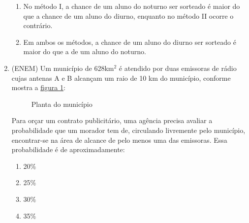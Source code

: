\begin{enumerate}
\begin{enumerate}
\item {} 
No método I, a chance de um aluno do noturno ser sorteado é maior do que a chance de um aluno do diurno, enquanto no método II ocorre o contrário.

\item {} 
Em ambos os métodos, a chance de um aluno do diurno ser sorteado é maior do que a de um aluno do noturno.

\end{enumerate}

\item (ENEM) Um município de $628$km$^2$ é atendido por duas emissoras de rádio cujas antenas A e B alcançam um raio de 10 km do município, conforme mostra a \hyperref[municipio]{figura \ref{municipio}}:
\begin{figure}[H]
\centering

\caption{Planta do município}
\label{municipio}
\end{figure}

Para orçar um contrato publicitário, uma agência precisa avaliar a probabilidade que um morador tem de, circulando livremente pelo município, encontrar-se na área de alcance de pelo menos uma das emissoras. Essa probabilidade é de aproximadamente:
\begin{enumerate}
\item {} 
20\%

\item {} 
25\%

\item {} 
30\%

\item {} 
35\%


\end{enumerate}
\end{enumerate}
